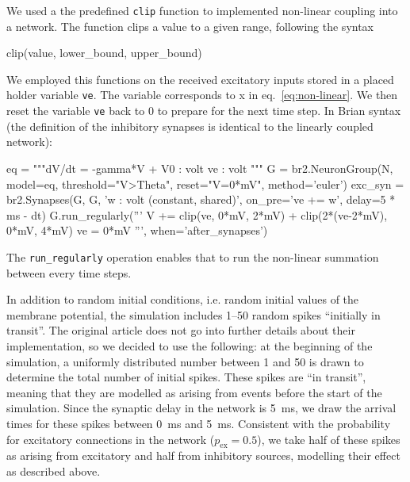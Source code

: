 \documentclass[10pt,a4paper,onecolumn]{article}
\begin{document}
We used a the predefined \verb|clip| function to implemented non-linear coupling into a network. The function clips a value to a given range, following the syntax
\begin{code}
clip(value, lower_bound, upper_bound)
\end{code}

We employed this functions on the received excitatory inputs stored in a placed holder variable \verb|ve|. The variable corresponds to x in eq.~\ref{eq:non-linear}. We then reset the variable \verb|ve| back to 0 to prepare for the next time step. In Brian syntax (the definition of the inhibitory synapses is identical to the linearly coupled network):


\begin{code}
eq = """dV/dt = -gamma*V + V0 : volt
        ve : volt
     """
G = br2.NeuronGroup(N, model=eq, threshold="V>Theta",
                    reset="V=0*mV", method='euler')
exc_syn = br2.Synapses(G, G, 'w : volt (constant, shared)',
                       on_pre='ve += w', delay=5 * ms - dt)
G.run_regularly('''
                V += clip(ve, 0*mV, 2*mV) + clip(2*(ve-2*mV), 0*mV, 4*mV)
                ve = 0*mV
                ''', when='after_synapses')
\end{code}

The \verb|run_regularly| operation enables that to run the non-linear summation between every time steps.

In addition to random initial conditions, i.e. random initial values of the membrane potential, the simulation includes 1--50 random spikes ``initially in transit''. The original article does not go into further details about their implementation, so we decided to use the following: at the beginning of the simulation, a uniformly distributed number between 1 and 50 is drawn to determine the total number of initial spikes. These spikes are ``in transit'', meaning that they are modelled as arising from events before the start of the simulation. Since the synaptic delay in the network is \SI{5}{\milli\second}, we draw the arrival times for these spikes between \SI{0}{\milli\second} and \SI{5}{\milli\second}. Consistent with the probability for excitatory connections in the network ($p_\text{ex}=0.5$), we take half of these spikes as arising from excitatory and half from inhibitory sources, modelling their effect as described above.
\end{document}
